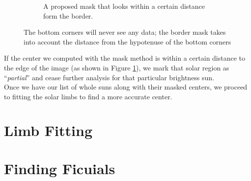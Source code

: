 \documentclass[10pt]{scrartcl}
\begin{document}
\begin{figure}[!ht]
\begin{subfigure}[b]{.45\linewidth}
        \caption{A proposed mask that looks within a certain distance form the border.}
        \label{aborder}
    \end{subfigure}
    \caption{The bottom corners will never see any data; the border mask takes into account the distance from the hypotenuse of the bottom corners}
    \label{cuttingcorners}
\end{figure}

If the center we computed with the mask method is within a certain distance to the edge of the image (as shown in Figure \ref{aborder}), we mark that solar region as ``\emph{partial}'' and cease further analysis for that particular brightness sun. \\
\indent Once we have our list of whole suns along with their masked centers, we proceed to fitting the solar limbs to find a more accurate center.

\section{Limb Fitting} %
\label{sec:limb_fitting}



\section{Finding Ficuials} %
\label{sec:finding_ficuials}

\end{document}
